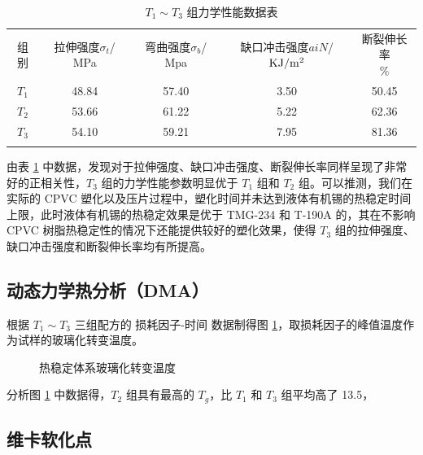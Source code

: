 \begin{table}[!htb]
    \caption{$T_1 \sim T_3$ 组力学性能数据表}
    \label{tab3Mach}
    \begin{center}
    \footnotesize{
        \begin{tabular}{ccccc}
			\Xhline{1pt}
			组别 & \makecell[c]{拉伸强度$\sigma_t$/\\MPa} & \makecell[c]{弯曲强度$\sigma_{b}$/\\Mpa} & \makecell[c]{缺口冲击强度$aiN$/\\$\rm{KJ/m^2}$} & \makecell[c]{断裂伸长率\\\%}	\\
			\Xhline{0.5pt}
			$T_1$ & 48.84 & 57.40 & 3.50 & 50.45	\\
			$T_2$ & 53.66 & 61.22 & 5.22 & 62.36	\\
			$T_3$ & 54.10 & 59.21 & 7.95 & 81.36	\\
			\Xhline{1pt}
        \end{tabular}
    }
    \end{center}
\end{table}

由表 \ref{tab3Mach} 中数据，发现对于拉伸强度、缺口冲击强度、断裂伸长率同样呈现了非常好的正相关性，$T_3$ 组的力学性能参数明显优于 $T_1$ 组和 $T_2$ 组。可以推测，我们在实际的 CPVC 塑化以及压片过程中，塑化时间并未达到液体有机锡的热稳定时间上限，此时液体有机锡的热稳定效果是优于 TMG-234 和 T-190A 的，其在不影响 CPVC 树脂热稳定性的情况下还能提供较好的塑化效果，使得 $T_3$ 组的拉伸强度、缺口冲击强度和断裂伸长率均有所提高。

\subsection{动态力学热分析（DMA）}
根据 $T_1 \sim T_3$ 三组配方的 损耗因子-时间 数据制得图 \ref{fig3Tg}，取损耗因子的峰值温度作为试样的玻璃化转变温度。

\begin{figure}[!htb]
    \begin{center}
        
    \end{center}
    \caption{热稳定体系玻璃化转变温度}
	\label{fig3Tg}
\end{figure}

分析图 \ref{fig3Tg} 中数据得，$T_2$ 组具有最高的 $T_g$，比 $T_1$ 和 $T_3$ 组平均高了 13.5\cd，

\subsection{维卡软化点}

